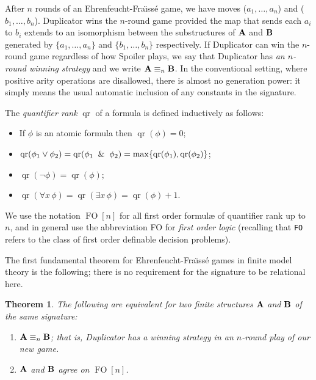 \documentclass[10pt,a4paper]{amsart}
\theoremstyle{plain}
\newtheorem{thm}{Theorem}[section]
\theoremstyle{definition}
\newcommand{\qr}{\operatorname{qr}}
\newcommand{\up}[1]{\textup{#1}}
\newcommand{\FO}{\operatorname{FO}}
\begin{document}
After $n$ rounds of an Ehrenfeucht-Fra\"{\i}ss\'e game, we have moves ($a_1,\dots,a_n$) and ($b_1,\dots,b_n$). 
Duplicator wins the $n$-round game  provided the map that sends each $a_i$ to $b_i$ extends to an isomorphism between the substructures of ${\bf A}$ and ${\bf B}$ generated by $\{a_1,\dots,a_n\}$ and $\{b_1,\dots,b_n\}$ respectively.  If Duplicator can win the $n$-round game regardless of how Spoiler plays, we say that Duplicator has \emph{an $n$-round winning strategy} and we write ${\bf A}\equiv_n{\bf B}$.  In the conventional setting, where positive arity operations are disallowed, there is almost no generation power: it simply means the usual automatic inclusion of any constants in the signature.  

The \emph{quantifier rank} $\qr$ of a formula is defined inductively as follows:
\begin{itemize}
\item If $\phi$ is an atomic formula then $\qr(\phi)=0$;
\item $\qr(\phi_1\vee\phi_2)=\qr(\phi_1\And\phi_2)=\max\{\qr(\phi_1),\qr(\phi_2)\}$;
\item $\qr(\neg\phi)=\qr(\phi)$;
\item $\qr(\forall x\,  \phi)=\qr(\exists x\, \phi)=\qr(\phi)+1$.\\
\end{itemize}
We use the notation $\FO[n]$ for all first order formul{\ae} of quantifier rank up to $n$, and in general use the abbreviation FO for \emph{first order logic}
(recalling that \texttt{FO} refers to the class of first order definable decision problems).

The first fundamental theorem for Ehrenfeucht-Fra\"{\i}ss\'e games in finite model theory is the following; there is no requirement for the signature to be relational here.
\begin{thm}\label{thm:algEF}
The following are equivalent for two finite structures ${\bf A}$ and ${\bf B}$ of the same signature\up:
\begin{enumerate}
\item ${\bf A}\equiv_n{\bf B}$\up; that is, Duplicator has a winning strategy in an $n$-round play of our new game.
\item ${\bf A}$ and ${\bf B}$ agree on $\FO[n]$.
\end{enumerate}
\end{thm}
\end{document}
